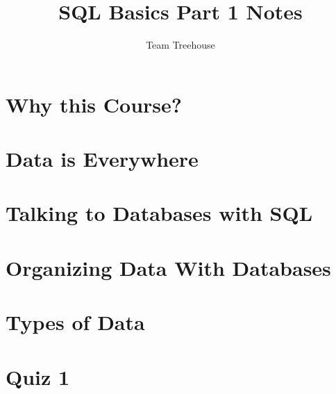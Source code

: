 \documentclass[12pt]{article}
\begin{document}
\title{SQL Basics Part 1 Notes}
\author{Team Treehouse}
\maketitle

\section{Why this Course?}

\bigskip

\section{Data is Everywhere}

\bigskip

\section{Talking to Databases with SQL}

\bigskip

\section{Organizing Data With Databases}

\bigskip

\section{Types of Data}

\bigskip

\section{Quiz 1}

\bigskip
\end{document}
